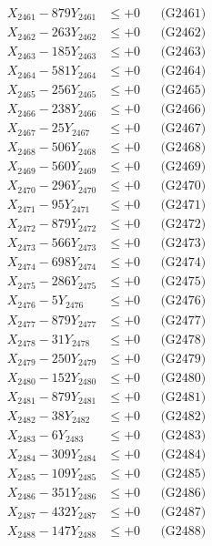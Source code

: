 \documentclass[a4paper,10pt]{article}
\begin{document}
{\begin{align}
\allowbreak
X_{2461} - 879Y_{2461} &\leq +0 && \text{(G2461)} \\
X_{2462} - 263Y_{2462} &\leq +0 && \text{(G2462)} \\
X_{2463} - 185Y_{2463} &\leq +0 && \text{(G2463)} \\
X_{2464} - 581Y_{2464} &\leq +0 && \text{(G2464)} \\
X_{2465} - 256Y_{2465} &\leq +0 && \text{(G2465)} \\
X_{2466} - 238Y_{2466} &\leq +0 && \text{(G2466)} \\
X_{2467} - 25Y_{2467} &\leq +0 && \text{(G2467)} \\
X_{2468} - 506Y_{2468} &\leq +0 && \text{(G2468)} \\
X_{2469} - 560Y_{2469} &\leq +0 && \text{(G2469)} \\
X_{2470} - 296Y_{2470} &\leq +0 && \text{(G2470)} \\
\allowbreak
X_{2471} - 95Y_{2471} &\leq +0 && \text{(G2471)} \\
X_{2472} - 879Y_{2472} &\leq +0 && \text{(G2472)} \\
X_{2473} - 566Y_{2473} &\leq +0 && \text{(G2473)} \\
X_{2474} - 698Y_{2474} &\leq +0 && \text{(G2474)} \\
X_{2475} - 286Y_{2475} &\leq +0 && \text{(G2475)} \\
X_{2476} - 5Y_{2476} &\leq +0 && \text{(G2476)} \\
X_{2477} - 879Y_{2477} &\leq +0 && \text{(G2477)} \\
X_{2478} - 31Y_{2478} &\leq +0 && \text{(G2478)} \\
X_{2479} - 250Y_{2479} &\leq +0 && \text{(G2479)} \\
X_{2480} - 152Y_{2480} &\leq +0 && \text{(G2480)} \\
\allowbreak
X_{2481} - 879Y_{2481} &\leq +0 && \text{(G2481)} \\
X_{2482} - 38Y_{2482} &\leq +0 && \text{(G2482)} \\
X_{2483} - 6Y_{2483} &\leq +0 && \text{(G2483)} \\
X_{2484} - 309Y_{2484} &\leq +0 && \text{(G2484)} \\
X_{2485} - 109Y_{2485} &\leq +0 && \text{(G2485)} \\
X_{2486} - 351Y_{2486} &\leq +0 && \text{(G2486)} \\
X_{2487} - 432Y_{2487} &\leq +0 && \text{(G2487)} \\
X_{2488} - 147Y_{2488} &\leq +0 && \text{(G2488)} \\

\end{align}}
\end{document}
